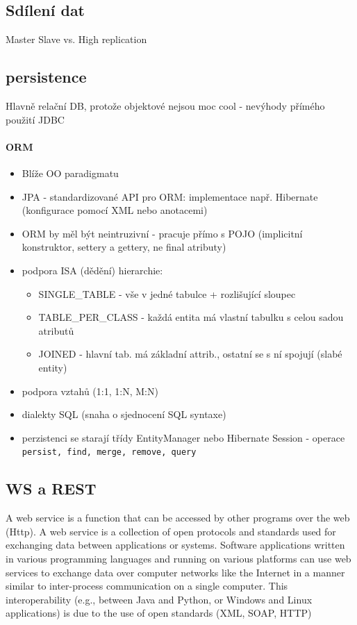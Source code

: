 \subsection{Sdílení dat}
Master Slave vs. High replication

\subsection{persistence}
Hlavně relační DB, protože objektové nejsou moc cool - nevýhody přímého použití JDBC
\paragraph{ORM}
\begin{itemize}[itemsep=0px]
\item Blíže OO paradigmatu
\item JPA - standardizované API pro ORM: implementace např. Hibernate (konfigurace pomocí XML nebo anotacemi)
\item ORM by měl být neintruzivní - pracuje přímo s POJO (implicitní konstruktor, settery a gettery, ne final atributy)
\item podpora ISA (dědění) hierarchie:
    \begin{itemize}[itemsep=0px]
    \item SINGLE\_TABLE - vše v jedné tabulce + rozlišující sloupec
    \item TABLE\_PER\_CLASS - každá entita má vlastní tabulku s celou sadou atributů
    \item JOINED - hlavní tab. má základní attrib., ostatní se s ní spojují (slabé entity)
    \end{itemize}
\item podpora vztahů (1:1, 1:N, M:N)
\item dialekty SQL (snaha o sjednocení SQL syntaxe)
\item perzistenci se starají třídy EntityManager nebo Hibernate Session - operace \texttt{persist, find, merge, remove, query}
\end{itemize}

\subsection{WS a REST}
A web service is a function that can be accessed by other programs over the web (Http). A web service is a collection of open protocols and standards used for exchanging data between applications or systems. Software applications written in various programming languages and running on various platforms can use web services to exchange data over computer networks like the Internet in a manner similar to inter-process communication on a single computer. This interoperability (e.g., between Java and Python, or Windows and Linux applications) is due to the use of open standards (XML, SOAP, HTTP)

